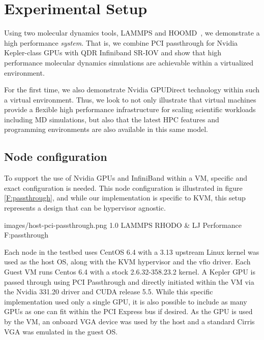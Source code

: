 \documentclass[times,10pt,twocolumn,conference]{IEEEtran}
\begin{document}



\section{Experimental Setup}

Using two molecular dynamics tools, LAMMPS\cite{plimpton2007lammps} and HOOMD~\cite{anderson2010hoomd}, we demonstrate a high performance \textit{system}.  That is, we combine PCI passthrough for Nvidia Kepler-class GPUs with QDR Infiniband SR-IOV and show that high performance molecular dynamics simulations are achievable within a virtualized environment. 

For the first time, we also demonstrate Nvidia GPUDirect technology within such a virtual environment.  Thus, we look to not only illustrate that virtual machines provide a flexible high performance infrastructure for scaling scientific workloads including MD simulations, but also that the latest HPC features and programming environments are also available in this same model.   

\subsection{Node configuration}

To support the use of Nvidia GPUs and InfiniBand within a VM, specific and exact configuration is needed. This node configuration is illustrated in figure \ref{F:passthrough}, and while our implementation is specific to KVM, this setup represents a design that can be hypervisor agnostic.

  {images/host-pci-passthrough.png}
  {1.0}
  {LAMMPS RHODO \& LJ Performance}
  {F:passthrough}


Each node in the testbed uses CentOS 6.4 with a 3.13 upstream Linux kernel was used as the host OS, along with the KVM hypervisor and the vfio driver. 
Each Guest VM runs Centos 6.4 with a stock 2.6.32-358.23.2 kernel.
A Kepler GPU is passed through using PCI Passthrough and directly initiated within the VM via the Nvidia 331.20 driver and CUDA release 5.5. While this specific implementation used only a single GPU, it is also possible to include as many GPUs as one can fit within the PCI Express bus if desired. As the GPU is used by the VM, an onboard VGA device was used by the host and a standard Cirris VGA was emulated in the guest OS. 
\end{document}
